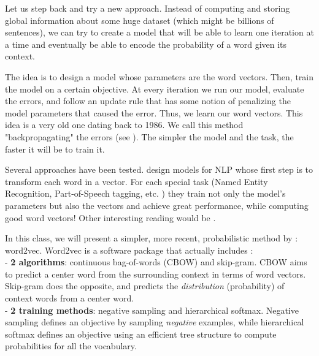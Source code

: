 \documentclass[nobib]{tufte-handout}
\begin{document}
Let us step back and try a new approach. Instead of computing and storing global information about some huge dataset (which might be billions of sentences), we can try to create a model that will be able to learn one iteration at a time and eventually be able to encode the probability of a word given its context. 

The idea is to design a model whose parameters are the word vectors. Then, train the model on a certain objective. At every iteration we run our model, evaluate the errors, and follow an update rule that has some notion of penalizing the model parameters that caused the error. Thus, we learn our word vectors. This idea is a very old one dating back to 1986. We call this method "backpropagating" the errors (see \cite{Rumelhart:1988:LRB:65669.104451}). The simpler the model and the task, the faster it will be to train it.


Several approaches have been tested. \cite{DBLP:journals/corr/abs-1103-0398} design models for NLP whose first step is to transform each word in a vector. For each special task (Named Entity Recognition, Part-of-Speech tagging, etc. ) they train not only the model's parameters but also the vectors and achieve great performance, while computing good word vectors! Other interesting reading would be \cite{Bengio:2003:NPL:944919.944966}.



In this class, we will present a simpler, more recent, probabilistic method by \cite{DBLP:journals/corr/abs-1301-3781} : word2vec. Word2vec is a software package that actually includes :\\
- \textbf{2 algorithms}: continuous bag-of-words (CBOW) and skip-gram. CBOW aims to predict a center word from the surrounding context in terms of word vectors. Skip-gram does the opposite, and predicts the \emph{distribution} (probability) of context words from a center word.\\
- \textbf{2 training methods}: negative sampling and hierarchical softmax. Negative sampling defines an objective by sampling \emph{negative} examples, while hierarchical softmax defines an objective using an efficient tree structure to compute probabilities for all the vocabulary.
\end{document}
